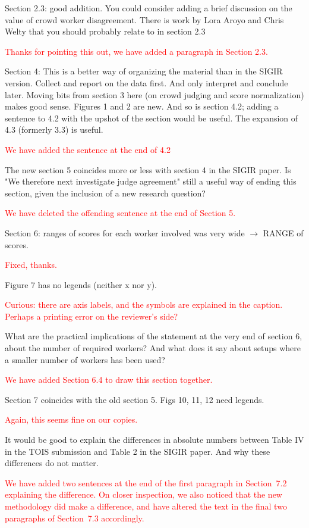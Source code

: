 \documentclass{article}
\newcommand{\comment}[1]{\vspace{1em} \textcolor{red}{{#1}} \vspace{1em}}
\begin{document}
Section 2.3: good addition. You could consider adding a brief
discussion on the value of crowd worker disagreement. There is work
by Lora Aroyo and Chris Welty that you should probably relate to
in section 2.3

\comment {Thanks for pointing this out, we have added a paragraph in Section 2.3.}

Section 4: This is a better way of organizing the material than in
the SIGIR version. Collect and report on the data first. And only
interpret and conclude later. Moving bits from section 3 here (on
crowd judging and score normalization) makes good sense. Figures 1
and 2 are new. And so is section 4.2; adding a sentence to 4.2 with
the upshot of the section would be useful. The expansion of 4.3
(formerly 3.3) is useful.

\comment {We have added the sentence at the end of 4.2}

The new section 5 coincides more  or less with section 4 in the
SIGIR paper. Is "We therefore next investigate judge agreement"
still a useful  way of ending this section, given the inclusion of
a new research question?

\comment {We have deleted the offending sentence at the end of Section 5.}

Section 6:  ranges of scores for each worker involved was very wide
$\rightarrow$ RANGE of scores. 

\comment {Fixed, thanks.}

Figure 7 has no legends (neither x nor y).

\comment {Curious: there are axis labels, and the symbols are explained
in the caption. Perhaps a printing error on the reviewer's side?} 

What are the practical implications of the statement at the very
end of section 6, about the number of required workers? And what
does it say about setups where a smaller number of workers has been
used?

\comment {We have added Section 6.4 to draw this section together.}

Section 7 coincides with the old section 5. 
Figs 10, 11, 12 need legends. 

\comment {Again, this seems fine on our copies.}

It would be good to explain the differences in absolute
numbers between Table IV in the TOIS submission and Table 2 in the
SIGIR paper. And why these differences do not matter.

\comment {We have added two sentences at the end of the first paragraph in Section~7.2 
explaining the difference. On closer inspection, we also noticed that the new methodology did make a
difference, and have altered the text in the final two paragraphs of Section~7.3 accordingly.}
\end{document}
